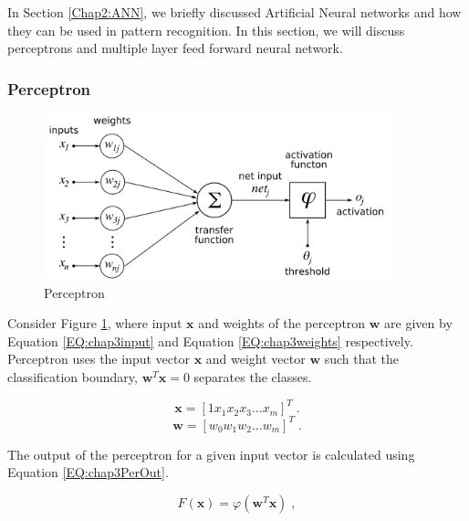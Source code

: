  	In Section \ref{Chap2:ANN}, we briefly discussed Artificial Neural networks and how they can be used in pattern recognition. In this section, we will discuss perceptrons and multiple layer feed forward neural network.
    
    \subsubsection{Perceptron}
    
    \begin{figure}[hbtp]
    	\centering
    	\includegraphics[width=0.9\textwidth]{Chapter-2/ann}
    	\caption{Perceptron \cite{aneuronimage}}
    	\label{fig:chap3ann}
    \end{figure}
    
    Consider Figure \ref{fig:chap3ann}, where input $\bm{x}$ and weights of the perceptron $\mathbf{w}$ are given by Equation \ref{EQ:chap3input} and Equation \ref{EQ:chap3weights} respectively. Perceptron uses the input vector $\mathbf{x}$ and weight vector $\mathbf{w}$ such that the classification boundary, $\mathbf{w}^T\mathbf{x} = 0$ separates the classes.
    
    
    \begin{equation}
    	\mathbf{x} = [1 x_1 x_2 x_3 \ldots x_m]^T \;.
        \label{EQ:chap3input}
    \end{equation}    
	\begin{equation}
    	\mathbf{w} = [w_0 w_1 w_2 \ldots w_m]^T \;.
        \label{EQ:chap3weights}
    \end{equation}

	The output of the perceptron for a given input vector is calculated using Equation \ref{EQ:chap3PerOut}.
    
    \begin{equation}
    	F(\mathbf{x}) = \varphi(\mathbf{w}^T\mathbf{x}) \;,
		\label{EQ:chap3PerOut}
    \end{equation}
        
